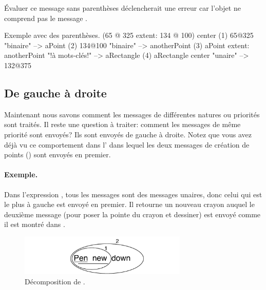 \documentclass[a4paper,10pt,twoside]{book}
\begin{document}
\'Evaluer ce message sans parenth\`eses d\'eclencherait une erreur car
l'objet  ne comprend pas le message .

\begin{example}[decExtent]{Exemple avec des parenth\`eses.}{}
      (65 @ 325 extent: 134 @ 100) center
(1)   65@325                                                    "binaire"
    --> aPoint
(2)                                134@100                     "binaire"
                                 --> anotherPoint
(3)   aPoint extent: anotherPoint                       "!\`a mots-cl\'es!"
      --> aRectangle
(4)   aRectangle center                                     "unaire"
      --> 132@375
\end{example}

\subsection{De gauche \`a droite}
Maintenant nous savons comment les messages de diff\'erentes natures
ou priorit\'es sont trait\'es. Il reste une question \`a traiter:
comment les messages de m\^eme priorit\'e sont envoy\'es? Ils sont
envoy\'es de gauche \`a droite. Notez que vous avez d\'ej\`a vu ce
comportement dans l' dans lequel les deux messages de
cr\'eation de points () sont envoy\'es en premier.



\paragraph{Exemple.} Dans l'expression , tous les
messages sont des messages unaires, donc celui qui est le plus \`a
gauche  est envoy\'e en premier. Il retourne un nouveau
crayon auquel le deuxi\`eme message  
(pour poser la pointe du crayon et dessiner)
est envoy\'e comme il est montr\'e dans .

\begin{figure}
	\centering
	\includegraphics[width=8cm]{ucompoUn}
	\caption{D\'ecomposition de .\label{fig:unaryMessages}}
\end{figure}
\end{document}
